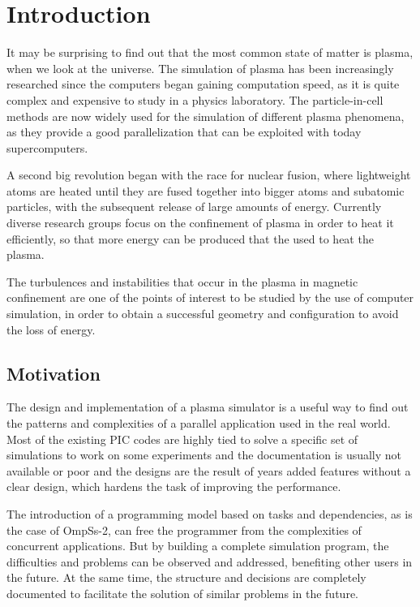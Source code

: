 \chapter{Introduction}
\label{ch:intro}

It may be surprising to find out that the most common state of matter is plasma, 
when we look at the universe. The simulation of plasma has been increasingly 
researched since the computers began gaining computation speed, as it is quite 
complex and expensive to study in a physics laboratory. The particle-in-cell 
methods are now widely used for the simulation of different plasma phenomena, as 
they provide a good parallelization that can be exploited with today 
supercomputers.

A second big revolution began with the race for nuclear fusion, where 
lightweight atoms are heated until they are fused together into bigger atoms and 
subatomic particles, with the subsequent release of large amounts of energy.  
Currently diverse research groups focus on the confinement of plasma in order to 
heat it efficiently, so that more energy can be produced that the used to heat 
the plasma.

The turbulences and instabilities that occur in the plasma in magnetic 
confinement are one of the points of interest to be studied by the use of 
computer simulation, in order to obtain a successful geometry and configuration 
to avoid the loss of energy.

\section{Motivation}

The design and implementation of a plasma simulator is a useful way to find out 
the patterns and complexities of a parallel application used in the real world.  
Most of the existing PIC codes are highly tied to solve a specific set of 
simulations to work on some experiments and the documentation is usually not 
available or poor and the designs are the result of years added features without 
a clear design, which hardens the task of improving the performance.

The introduction of a programming model based on tasks and dependencies, as is 
the case of OmpSs-2, can free the programmer from the complexities of concurrent 
applications. But by building a complete simulation program, the difficulties 
and problems can be observed and addressed, benefiting other users in the 
future. At the same time, the structure and decisions are completely documented 
to facilitate the solution of similar problems in the future.

